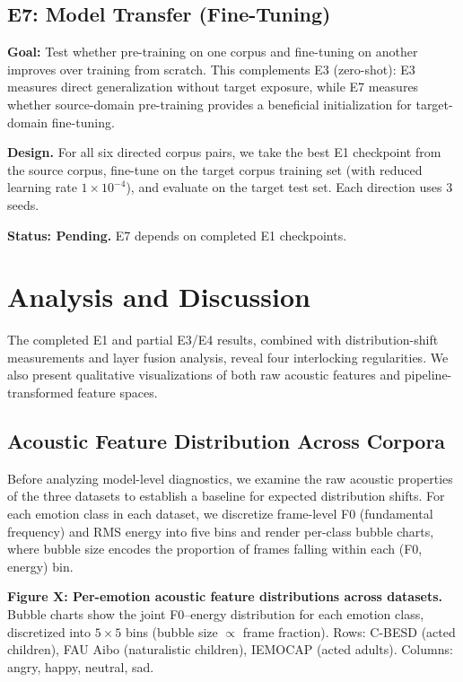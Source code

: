 \documentclass[11pt,a4paper]{article}
\begin{document}
\subsection{E7: Model Transfer (Fine-Tuning)}
\label{ssec:e7}

\textbf{Goal:} Test whether pre-training on one corpus and fine-tuning on
another improves over training from scratch. This complements E3 (zero-shot):
E3 measures direct generalization without target exposure, while E7 measures
whether source-domain pre-training provides a beneficial initialization for
target-domain fine-tuning.

\textbf{Design.} For all six directed corpus pairs, we take the best E1
checkpoint from the source corpus, fine-tune on the target corpus training set
(with reduced learning rate $1\times10^{-4}$), and evaluate on the target test
set. Each direction uses 3 seeds.

\textbf{Status: Pending.} E7 depends on completed E1 checkpoints.


\section{Analysis and Discussion}
\label{sec:analysis}

The completed E1 and partial E3/E4 results, combined with distribution-shift
measurements and layer fusion analysis, reveal four interlocking regularities.
We also present qualitative visualizations of both raw acoustic features and
pipeline-transformed feature spaces.

\subsection{Acoustic Feature Distribution Across Corpora}

Before analyzing model-level diagnostics, we examine the raw acoustic
properties of the three datasets to establish a baseline for expected
distribution shifts. For each emotion class in each dataset, we discretize
frame-level F0 (fundamental frequency) and RMS energy into five bins and
render per-class bubble charts, where bubble size encodes the proportion of
frames falling within each (F0, energy) bin.

\textbf{Figure X: Per-emotion acoustic feature distributions across datasets.}
Bubble charts show the joint F0--energy distribution for each emotion class,
discretized into $5 \times 5$ bins (bubble size $\propto$ frame fraction).
Rows: C-BESD (acted children), FAU Aibo (naturalistic children), IEMOCAP
(acted adults). Columns: angry, happy, neutral, sad.
\end{document}
